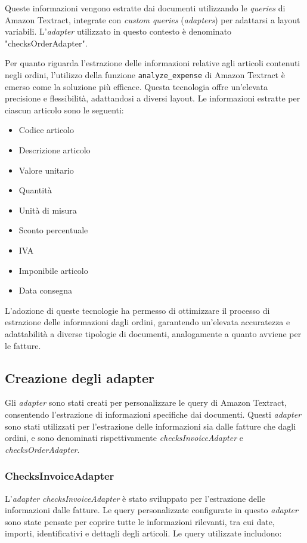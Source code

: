 Queste informazioni vengono estratte dai documenti utilizzando le \textit{queries} di Amazon Textract, integrate con \textit{custom queries} (\textit{adapters}) per adattarsi a layout variabili. L'\textit{adapter} utilizzato in questo contesto è denominato "checksOrderAdapter".

Per quanto riguarda l'estrazione delle informazioni relative agli articoli contenuti negli ordini, l'utilizzo della funzione \texttt{analyze\_expense} di Amazon Textract è emerso come la soluzione più efficace. Questa tecnologia offre un'elevata precisione e flessibilità, adattandosi a diversi layout. Le informazioni estratte per ciascun articolo sono le seguenti:

\begin{itemize}
    \item Codice articolo
    \item Descrizione articolo
    \item Valore unitario
    \item Quantità
    \item Unità di misura
    \item Sconto percentuale
    \item IVA
    \item Imponibile articolo
    \item Data consegna
\end{itemize}

L'adozione di queste tecnologie ha permesso di ottimizzare il processo di estrazione delle informazioni dagli ordini, garantendo un'elevata accuratezza e adattabilità a diverse tipologie di documenti, analogamente a quanto avviene per le fatture.

\subsection{Creazione degli adapter}
Gli \textit{adapter} sono stati creati per personalizzare le query di Amazon Textract, consentendo l'estrazione di informazioni specifiche dai documenti. Questi \textit{adapter} sono stati utilizzati per l'estrazione delle informazioni sia dalle fatture che dagli ordini, e sono denominati rispettivamente \textit{checksInvoiceAdapter} e \textit{checksOrderAdapter}.

\subsubsection{ChecksInvoiceAdapter}
L'\textit{adapter} \textit{checksInvoiceAdapter} è stato sviluppato per l'estrazione delle informazioni dalle fatture. Le query personalizzate configurate in questo \textit{adapter} sono state pensate per coprire tutte le informazioni rilevanti, tra cui date, importi, identificativi e dettagli degli articoli. Le query utilizzate includono:


